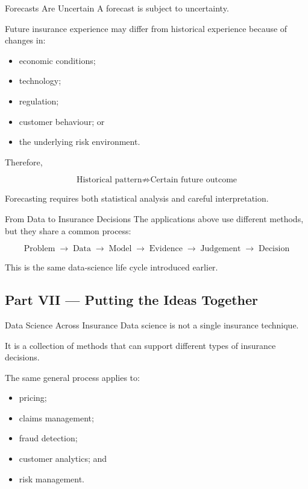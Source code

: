 \documentclass[
  ignorenonframetext,
  aspectratio=169,
]{beamer}
\providecommand{\tightlist}{%
  \setlength{\itemsep}{0pt}\setlength{\parskip}{0pt}}
\begin{document}
\begin{frame}{Forecasts Are Uncertain}
\protect{}\label{forecasts-are-uncertain}
A forecast is subject to uncertainty.

Future insurance experience may differ from historical experience
because of changes in:

\begin{itemize}
\tightlist
\item
  economic conditions;
\item
  technology;
\item
  regulation;
\item
  customer behaviour; or
\item
  the underlying risk environment.
\end{itemize}

Therefore,

\[
\boxed{
\text{Historical pattern}
\not\Rightarrow
\text{Certain future outcome}
}
\]

Forecasting requires both statistical analysis and careful
interpretation.
\end{frame}

\begin{frame}{From Data to Insurance Decisions}
\protect{}\label{from-data-to-insurance-decisions}
The applications above use different methods, but they share a common
process:

\[
\boxed{
\text{Problem}
\;\rightarrow\;
\text{Data}
\;\rightarrow\;
\text{Model}
\;\rightarrow\;
\text{Evidence}
\;\rightarrow\;
\text{Judgement}
\;\rightarrow\;
\text{Decision}
}
\]

This is the same data-science life cycle introduced earlier.
\end{frame}

\subsection{Part VII --- Putting the Ideas
Together}\label{part-vii-putting-the-ideas-together}

\begin{frame}{Data Science Across Insurance}
\protect{}\label{data-science-across-insurance}
Data science is not a single insurance technique.

It is a collection of methods that can support different types of
insurance decisions.

The same general process applies to:

\begin{itemize}
\tightlist
\item
  pricing;
\item
  claims management;
\item
  fraud detection;
\item
  customer analytics; and
\item
  risk management.
\end{itemize}
\end{frame}
\end{document}
